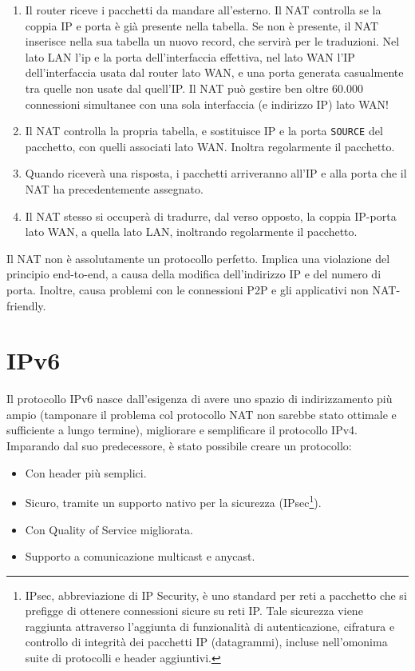 \begin{enumerate}
	\item Il router riceve i pacchetti da mandare all'esterno. Il NAT controlla se la coppia IP e porta è già presente nella tabella. Se non è presente, il NAT inserisce nella sua tabella un nuovo record, che servirà per le traduzioni. Nel lato LAN l'ip e la porta dell'interfaccia effettiva, nel lato WAN l'IP dell'interfaccia usata dal router lato WAN, e una porta generata casualmente tra quelle non usate dal quell'IP. Il NAT può gestire ben oltre 60.000 connessioni simultanee con una sola interfaccia (e indirizzo IP) lato WAN!
	
	\item Il NAT controlla la propria tabella, e sostituisce IP e la porta \verb|SOURCE| del pacchetto, con quelli associati lato WAN. Inoltra regolarmente il pacchetto.
	
	\item Quando riceverà una risposta, i pacchetti arriveranno all'IP e alla porta che il NAT ha precedentemente assegnato.
	
	\item Il NAT stesso si occuperà di tradurre, dal verso opposto, la coppia IP-porta lato WAN, a quella lato LAN, inoltrando regolarmente il pacchetto.
\end{enumerate}
Il NAT non è assolutamente un protocollo perfetto. Implica una violazione del principio end-to-end, a causa della modifica dell'indirizzo IP e del numero di porta. Inoltre, causa problemi con le connessioni P2P e gli applicativi non NAT-friendly.

\newpage

\section{IPv6}
Il protocollo IPv6 nasce dall'esigenza di avere uno spazio di indirizzamento più ampio (tamponare il problema col protocollo NAT non sarebbe stato ottimale e sufficiente a lungo termine), migliorare e semplificare il protocollo IPv4. Imparando dal suo predecessore, è stato possibile creare un protocollo:
\begin{itemize}
	\item Con header più semplici.
	\item Sicuro, tramite un supporto nativo per la sicurezza (IPsec\footnote{IPsec, abbreviazione di IP Security, è uno standard per reti a pacchetto che si prefigge di ottenere connessioni sicure su reti IP. Tale sicurezza viene raggiunta attraverso l'aggiunta di funzionalità di autenticazione, cifratura e controllo di integrità dei pacchetti IP (datagrammi), incluse nell'omonima suite di protocolli e header aggiuntivi.}).
	\item Con Quality of Service migliorata.
	\item Supporto a comunicazione multicast e anycast.
\end{itemize}

